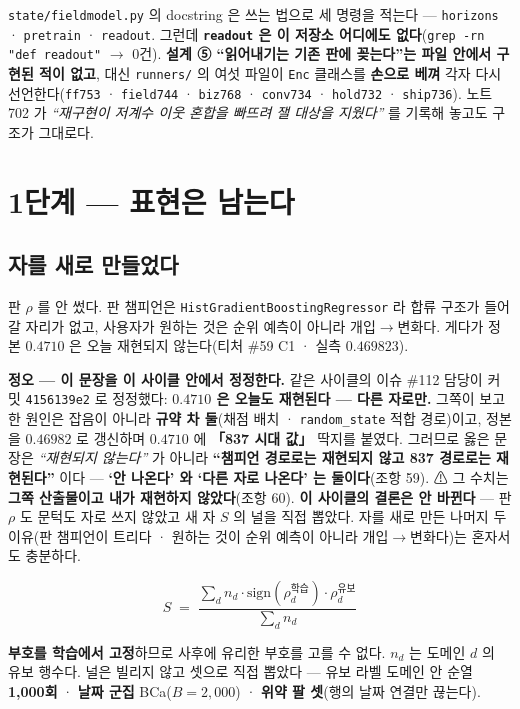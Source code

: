 \documentclass[10pt]{article}
\begin{document}
\texttt{state/fieldmodel.py} 의 docstring 은 쓰는 법으로 세 명령을 적는다 ---
\texttt{horizons} · \texttt{pretrain} · \texttt{readout}. 그런데
\textbf{\texttt{readout} 은 이 저장소 어디에도 없다}(\texttt{grep -rn "def readout"}
$\to$ 0건). \textbf{설계 ⑤ ``읽어내기는 기존 판에 꽂는다''는 파일 안에서 구현된 적이
없고}, 대신 \texttt{runners/} 의 여섯 파일이 \texttt{Enc} 클래스를 \textbf{손으로
베껴} 각자 다시 선언한다(\texttt{ff753} · \texttt{field744} · \texttt{biz768} ·
\texttt{conv734} · \texttt{hold732} · \texttt{ship736}). 노트 702 가 \emph{``재구현이
저계수 이웃 혼합을 빠뜨려 잴 대상을 지웠다''} 를 기록해 놓고도 구조가 그대로다.

\section{1단계 --- 표현은 남는다}

\subsection{자를 새로 만들었다}

판 $\rho$ 를 안 썼다. 판 챔피언은 \texttt{HistGradientBoostingRegressor} 라 합류
구조가 들어갈 자리가 없고, 사용자가 원하는 것은 순위 예측이 아니라 개입$\to$변화다.
게다가 정본 $0.4710$ 은 오늘 재현되지 않는다(티처 \#59 C1 · 실측 $0.469823$).

\textbf{정오 --- 이 문장을 이 사이클 안에서 정정한다.} 같은 사이클의 이슈 \#112 담당이
커밋 \texttt{4156139e2} 로 정정했다: \textbf{$0.4710$ 은 오늘도 재현된다 --- 다른 자로만.}
그쪽이 보고한 원인은 잡음이 아니라 \textbf{규약 차 둘}(채점 배치 · \texttt{random\_state}
적합 경로)이고, 정본을 $0.46982$ 로 갱신하며 $0.4710$ 에 \textbf{「837 시대 값」} 딱지를
붙였다. 그러므로 옳은 문장은 \emph{``재현되지 않는다''} 가 아니라
\textbf{``챔피언 경로로는 재현되지 않고 837 경로로는 재현된다''} 이다 ---
\textbf{`안 나온다' 와 `다른 자로 나온다' 는 둘이다}(조항 59).
⚠ 그 수치는 \textbf{그쪽 산출물이고 내가 재현하지 않았다}(조항 60).
\textbf{이 사이클의 결론은 안 바뀐다} --- 판 $\rho$ 도 문턱도 자로 쓰지 않았고 새 자 $S$ 의
널을 직접 뽑았다. 자를 새로 만든 나머지 두 이유(판 챔피언이 트리다 · 원하는 것이 순위
예측이 아니라 개입$\to$변화다)는 혼자서도 충분하다.

\[
S \;=\; \frac{\sum_d n_d \cdot \mathrm{sign}(\rho^{\text{학습}}_d)\cdot
\rho^{\text{유보}}_d}{\sum_d n_d}
\]

\textbf{부호를 학습에서 고정}하므로 사후에 유리한 부호를 고를 수 없다.
$n_d$ 는 도메인 $d$ 의 유보 행수다. 널은 빌리지 않고 셋으로 직접 뽑았다 ---
유보 라벨 도메인 안 순열 \textbf{1,000회} · \textbf{날짜 군집} BCa($B{=}2{,}000$) ·
\textbf{위약 팔 셋}(행의 날짜 연결만 끊는다).
\end{document}
